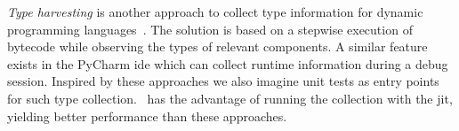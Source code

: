 \documentclass[sigplan,10pt,review,anonymous]{acmart}
\begin{document}

\emph{Type harvesting} is another approach to collect type information for
dynamic programming languages~\cite{haupt2011type}. The solution is based on a
stepwise execution of bytecode while observing the types of relevant
components. A similar feature exists in the PyCharm \ac{ide} which can collect
runtime information during a debug session. Inspired by these approaches we also
imagine unit tests as entry points for such type collection. \graallsp~has the
advantage of running the collection with the \ac{jit}, yielding better
performance than these approaches.





\end{document}

